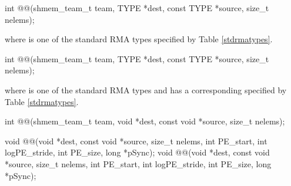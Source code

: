 
\begin{apidefinition}

\begin{C11synopsis}
int @@(shmem_team_t team, TYPE *dest, const TYPE *source, size_t nelems);
\end{C11synopsis}
where \TYPE{} is one of the standard \ac{RMA} types specified by Table \ref{stdrmatypes}.

\begin{Csynopsis}
\end{Csynopsis}
\begin{CsynopsisCol}
int @@(shmem_team_t team, TYPE *dest, const TYPE *source, size_t nelems);
\end{CsynopsisCol}
where \TYPE{} is one of the standard \ac{RMA} types and has a corresponding \TYPENAME{} specified by Table \ref{stdrmatypes}.

\begin{CsynopsisCol}
int @@(shmem_team_t team, void *dest, const void *source, size_t nelems);
\end{CsynopsisCol}

\begin{DeprecateBlock}
\begin{CsynopsisCol}
void @@(void *dest, const void *source, size_t nelems, int PE_start, int logPE_stride, int PE_size, long *pSync);
void @@(void *dest, const void *source, size_t nelems, int PE_start, int logPE_stride, int PE_size, long *pSync);
\end{CsynopsisCol}
\end{DeprecateBlock}

\begin{apiarguments}

%



\end{apiarguments}
\end{apidefinition}
